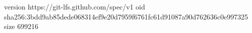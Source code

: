version https://git-lfs.github.com/spec/v1
oid sha256:3bdd9ab85dede068314ef9e20d7959f6761fc61d91087a90d762636c0e997325
size 699216
